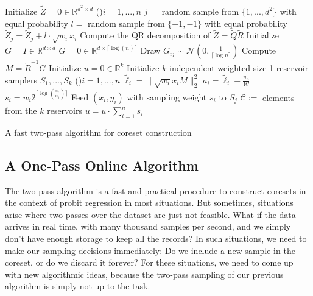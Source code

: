 \begin{algorithm}
    \DontPrintSemicolon
    Initialize $\tilde{Z} = 0 \in \mathbb{R}^{d^2 \times d}$ \;
    \For(){$i = 1,...,n$}{
        $j = $ random sample from $\{1, ..., d^2\}$ with equal probability \;
        $l = $ random sample from $\{+1, -1\}$ with equal probability \;
        $\tilde{Z}_j = \tilde{Z}_j + l \cdot \sqrt{w_i} x_i$
    }
    Compute the QR decomposition of $\tilde{Z} = \tilde{Q}\tilde{R}$ \;
    Initialize $G = I \in \mathbb{R}^{d \times d}$ \;
     {
        $G = 0 \in \mathbb{R}^{d \times \lceil\log(n)\rceil}$ \;
        Draw $G_{ij} \sim \mathcal{N}(0, \frac{1}{\lceil\log{n}\rceil})$
    }
    Compute $M = \tilde{R}^{-1} G$ \;
    Initialize $u = 0 \in \mathbb{R}^k$
    Initialize $k$ independent weighted size-1-reservoir samplers $S_1, ..., S_k$ \;
    \For(){$i = 1, ..., n$}{
        $\tilde{\ell}_i = \lVert \sqrt{w_i} x_i M\rVert_2^2$
        $a_i = \tilde{\ell}_i + \frac{w_i}{\mathcal{W}}$
        $s_i = w_i 2^{\lceil\log(\frac{a_i}{w_i})\rceil}$
         {
            Feed $(x_i, y_i)$ with sampling weight $s_i$ to $S_j$ \;
        }
    }
    $\mathcal{C} := $ elements from the $k$ reservoirs \;
    $u = u \cdot \sum_{i=1}^n s_i$
    \caption{A fast two-pass algorithm for coreset construction\label{algo:two-pass}}
\end{algorithm}

\subsection{A One-Pass Online Algorithm}

The two-pass algorithm is a fast and practical procedure to
construct coresets in the context of probit regression in most
situations. But sometimes, situations arise where two passes
over the dataset are just not feasible.
What if the data arrives in real time, with many thousand
samples per second, and we simply don't
have enough storage to keep all the records?
In such situations, we need to make our sampling decisions
immediately: Do we include a new sample in the coreset, or
do we discard it forever?
For these situations, we need to come up with new algorithmic
ideas, because the two-pass sampling of our previous algorithm
is simply not up to the task.

